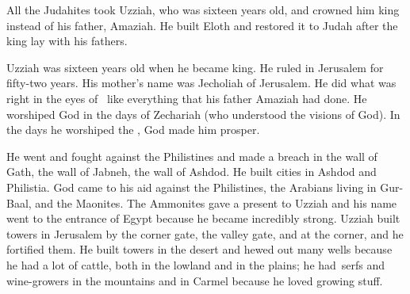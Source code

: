 
\begin{inparaenum}
   All the Judahites took Uzziah, who was sixteen years old, and crowned him king instead of his father, Amaziah.%
   He built Eloth and restored it to Judah after the king lay with his fathers.%
  
   Uzziah was sixteen years old when he became king. He ruled in Jerusalem for fifty-two years. His mother's name was Jecholiah of Jerusalem.%
   He did what was right in the eyes of \god\ like everything that his father Amaziah had done.%
   He worshiped God in the days of Zechariah (who understood the visions of God). In the days he worshiped the \lord, God made him prosper.%
  
   He went and fought against the Philistines and made a breach in the wall of Gath, the wall of Jabneh, the wall of Ashdod. He built cities in Ashdod and Philistia.%
   God came to his aid against the Philistines, the Arabians living in Gur-Baal, and the Maonites.%
   The Ammonites gave a present to Uzziah and his name went to the entrance of Egypt because he became incredibly strong.%
   Uzziah built towers in Jerusalem by the corner gate, the valley gate, and at the corner, and he fortified them.%
   He built towers in the desert and hewed out many wells because he had a lot of cattle, both in the lowland and in the plains; he had\understood\ serfs and wine-growers in the mountains and in Carmel because he loved growing stuff.%
  

\end{inparaenum}
